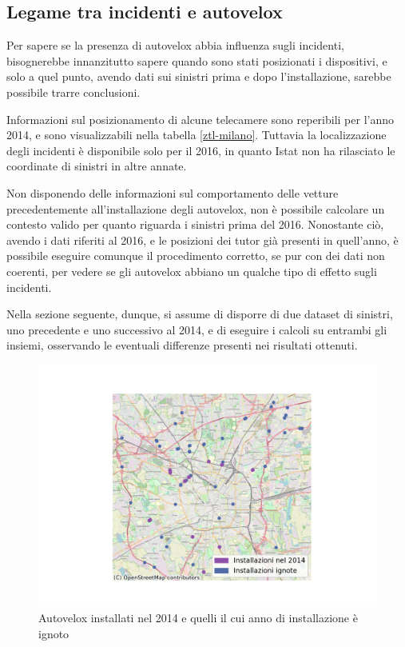 \documentclass[a4paper,12pt]{report}
\begin{document}
\subsection{Legame tra incidenti e autovelox}

Per sapere se la presenza di autovelox abbia influenza sugli incidenti, 
bisognerebbe innanzitutto sapere quando sono stati posizionati i dispositivi, e solo 
a quel punto, avendo dati sui sinistri prima e dopo l'installazione, sarebbe 
possibile trarre conclusioni. 

Informazioni sul posizionamento di alcune telecamere sono reperibili per 
l'anno 2014, e sono visualizzabili nella tabella \ref{ztl-milano}. 
Tuttavia la localizzazione degli incidenti 
è disponibile solo per il 2016, in quanto Istat non ha rilasciato 
le coordinate di sinistri in altre annate. 


Non disponendo delle informazioni sul comportamento delle vetture 
precedentemente all'installazione degli autovelox, 
non è possibile calcolare un contesto valido per quanto riguarda 
i sinistri prima del 2016. 
Nonostante ciò, avendo i dati riferiti al 2016, e le posizioni dei tutor 
già presenti in quell'anno, è possibile eseguire comunque il procedimento corretto, 
se pur con dei dati non coerenti, per vedere se gli 
autovelox abbiano un qualche tipo di effetto sugli incidenti.

Nella sezione seguente, dunque, si assume di disporre di due dataset di sinistri, uno 
precedente e uno successivo al 2014, e di eseguire i calcoli su entrambi gli insiemi, 
osservando le eventuali differenze presenti nei risultati ottenuti.

\begin{figure}
    \includegraphics[width=\linewidth]{../src/autovelox/autovelox_2014.png}
    \caption{Autovelox installati nel 2014 e quelli il cui anno di installazione è ignoto}
    \label{fig:autovelox-indici}
\end{figure}
\end{document}
